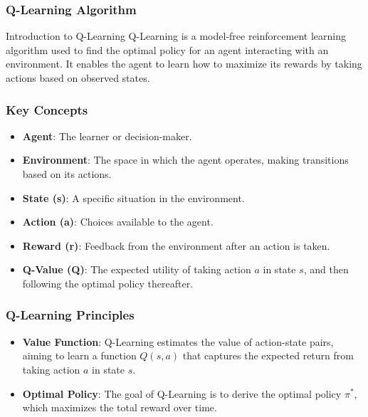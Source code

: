 \documentclass[aspectratio=169]{beamer}
\begin{document}
\begin{frame}[fragile]
    \frametitle{Q-Learning Algorithm}
    \begin{block}{Introduction to Q-Learning}
        Q-Learning is a model-free reinforcement learning algorithm used to find the optimal policy for an agent interacting with an environment. It enables the agent to learn how to maximize its rewards by taking actions based on observed states.
    \end{block}
\end{frame}

\begin{frame}[fragile]
    \frametitle{Key Concepts}
    \begin{itemize}
        \item \textbf{Agent}: The learner or decision-maker.
        \item \textbf{Environment}: The space in which the agent operates, making transitions based on its actions.
        \item \textbf{State (s)}: A specific situation in the environment.
        \item \textbf{Action (a)}: Choices available to the agent.
        \item \textbf{Reward (r)}: Feedback from the environment after an action is taken.
        \item \textbf{Q-Value (Q)}: The expected utility of taking action $a$ in state $s$, and then following the optimal policy thereafter.
    \end{itemize}
\end{frame}

\begin{frame}[fragile]
    \frametitle{Q-Learning Principles}
    \begin{itemize}
        \item \textbf{Value Function}: Q-Learning estimates the value of action-state pairs, aiming to learn a function $Q(s, a)$ that captures the expected return from taking action $a$ in state $s$.
        \item \textbf{Optimal Policy}: The goal of Q-Learning is to derive the optimal policy $\pi^*$, which maximizes the total reward over time.
    \end{itemize}
\end{frame}
\end{document}
